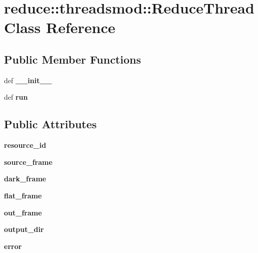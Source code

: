 \section{reduce::threadsmod::Reduce\-Thread Class Reference}
\label{classreduce_1_1threadsmod_1_1ReduceThread}
\subsection*{Public Member Functions}
\begin{CompactItemize}
\item 
def \textbf{\_\-\_\-init\_\-\_\-}\label{classreduce_1_1threadsmod_1_1ReduceThread_500760c95b1cb0534fa3b73825273f72}

\item 
def \textbf{run}\label{classreduce_1_1threadsmod_1_1ReduceThread_d74e2e2e8f7fcf754452d226e8dd1a46}

\end{CompactItemize}
\subsection*{Public Attributes}
\begin{CompactItemize}
\item 
\textbf{resource\_\-id}\label{classreduce_1_1threadsmod_1_1ReduceThread_1ed82cb4c5b65520d26fef49cc4110c7}

\item 
\textbf{source\_\-frame}\label{classreduce_1_1threadsmod_1_1ReduceThread_a8abf4e580b803a35f626f5d18ef171f}

\item 
\textbf{dark\_\-frame}\label{classreduce_1_1threadsmod_1_1ReduceThread_e54fb58fae9ca488bb20a49dffa91d35}

\item 
\textbf{flat\_\-frame}\label{classreduce_1_1threadsmod_1_1ReduceThread_4749b147476a3e8568b6e4730b549eeb}

\item 
\textbf{out\_\-frame}\label{classreduce_1_1threadsmod_1_1ReduceThread_44722815ddd76be8cd309c42a42015ba}

\item 
\textbf{output\_\-dir}\label{classreduce_1_1threadsmod_1_1ReduceThread_e4deaed73fc763f35718dedc5727637a}

\item 
\textbf{error}\label{classreduce_1_1threadsmod_1_1ReduceThread_81112eeec3b971b6fb96825fe47d0a17}

\end{CompactItemize}



